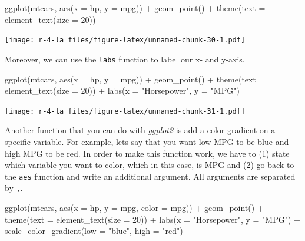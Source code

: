 \documentclass[
]{book}
\newenvironment{Shaded}{\begin{snugshade}}{\end{snugshade}}
\newcommand{\AttributeTok}[1]{\textcolor[rgb]{0.77,0.63,0.00}{#1}}
\newcommand{\DecValTok}[1]{\textcolor[rgb]{0.00,0.00,0.81}{#1}}
\newcommand{\FunctionTok}[1]{\textcolor[rgb]{0.00,0.00,0.00}{#1}}
\newcommand{\NormalTok}[1]{#1}
\newcommand{\SpecialCharTok}[1]{\textcolor[rgb]{0.00,0.00,0.00}{#1}}
\newcommand{\StringTok}[1]{\textcolor[rgb]{0.31,0.60,0.02}{#1}}
\begin{document}
\begin{Shaded}
\begin{Highlighting}[]
\FunctionTok{ggplot}\NormalTok{(mtcars, }\FunctionTok{aes}\NormalTok{(}\AttributeTok{x =}\NormalTok{ hp, }\AttributeTok{y =}\NormalTok{ mpg)) }\SpecialCharTok{+} 
      \FunctionTok{geom\_point}\NormalTok{() }\SpecialCharTok{+} 
      \FunctionTok{theme}\NormalTok{(}\AttributeTok{text =} \FunctionTok{element\_text}\NormalTok{(}\AttributeTok{size =} \DecValTok{20}\NormalTok{))}
\end{Highlighting}
\end{Shaded}

\texttt{[image: r-4-la\_files/figure-latex/unnamed-chunk-30-1.pdf]}

Moreover, we can use the \texttt{labs} function to label our x- and y-axis.

\begin{Shaded}
\begin{Highlighting}[]
\FunctionTok{ggplot}\NormalTok{(mtcars, }\FunctionTok{aes}\NormalTok{(}\AttributeTok{x =}\NormalTok{ hp, }\AttributeTok{y =}\NormalTok{ mpg)) }\SpecialCharTok{+} 
      \FunctionTok{geom\_point}\NormalTok{() }\SpecialCharTok{+} 
      \FunctionTok{theme}\NormalTok{(}\AttributeTok{text =} \FunctionTok{element\_text}\NormalTok{(}\AttributeTok{size =} \DecValTok{20}\NormalTok{)) }\SpecialCharTok{+} 
      \FunctionTok{labs}\NormalTok{(}\AttributeTok{x =} \StringTok{"Horsepower"}\NormalTok{, }\AttributeTok{y =} \StringTok{"MPG"}\NormalTok{)}
\end{Highlighting}
\end{Shaded}

\texttt{[image: r-4-la\_files/figure-latex/unnamed-chunk-31-1.pdf]}

Another function that you can do with \emph{ggplot2} is add a color gradient on a specific variable. For example, lets say that you want low MPG to be blue and high MPG to be red. In order to make this function work, we have to (1) state which variable you want to color, which in this case, is MPG and (2) go back to the \texttt{aes} function and write an additional argument. All arguments are separated by \texttt{,}.

\begin{Shaded}
\begin{Highlighting}[]
\FunctionTok{ggplot}\NormalTok{(mtcars, }\FunctionTok{aes}\NormalTok{(}\AttributeTok{x =}\NormalTok{ hp, }\AttributeTok{y =}\NormalTok{ mpg, }\AttributeTok{color =}\NormalTok{ mpg)) }\SpecialCharTok{+} 
      \FunctionTok{geom\_point}\NormalTok{() }\SpecialCharTok{+} 
      \FunctionTok{theme}\NormalTok{(}\AttributeTok{text =} \FunctionTok{element\_text}\NormalTok{(}\AttributeTok{size =} \DecValTok{20}\NormalTok{)) }\SpecialCharTok{+} 
      \FunctionTok{labs}\NormalTok{(}\AttributeTok{x =} \StringTok{"Horsepower"}\NormalTok{, }\AttributeTok{y =} \StringTok{"MPG"}\NormalTok{) }\SpecialCharTok{+} 
      \FunctionTok{scale\_color\_gradient}\NormalTok{(}\AttributeTok{low =} \StringTok{"blue"}\NormalTok{, }\AttributeTok{high =} \StringTok{"red"}\NormalTok{)}
\end{Highlighting}
\end{Shaded}
\end{document}
